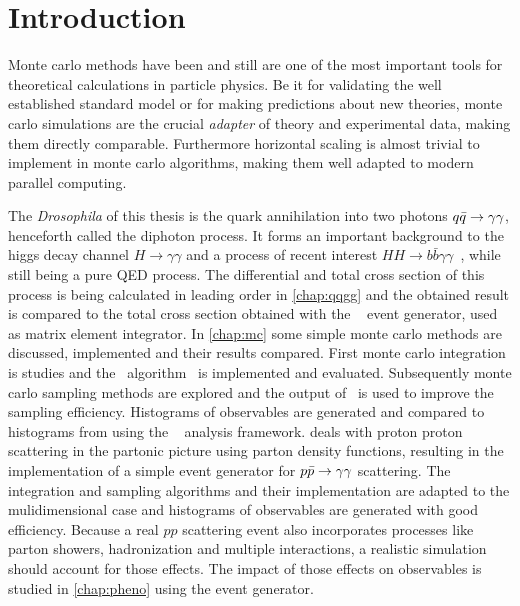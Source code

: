 \chapter{Introduction}%
\label{chap:intro}

Monte carlo methods have been and still are one of the most important
tools for theoretical calculations in particle physics. Be it for
validating the well established standard model or for making
predictions about new theories, monte carlo simulations are the
crucial \emph{adapter} of theory and experimental data, making them
directly comparable. Furthermore horizontal scaling is almost trivial
to implement in monte carlo algorithms, making them well adapted to
modern parallel computing.

The \emph{Drosophila} of this thesis is the quark annihilation into
two photons \(q\bar{q}\rightarrow\gamma\gamma\), henceforth called the diphoton process. It
forms an important background to the higgs decay channel
\(H\rightarrow \gamma\gamma\) and a process of recent interest
\(HH\rightarrow b\bar{b}\gamma\gamma\)~\cite{aaboud2018:sf}, while
still being a pure QED process. The differential and total cross
section of this process is being calculated in leading order in
\cref{chap:qqgg} and the obtained result is compared to the total
cross section obtained with the \sherpa~\cite{Gleisberg:2008ta} event
generator, used as matrix element integrator. In \cref{chap:mc} some
simple monte carlo methods are discussed, implemented and their
results compared. First monte carlo integration is studies and the
\vegas\ algorithm~\cite{Lepage:19781an} is implemented and
evaluated. Subsequently monte carlo sampling methods are explored and
the output of \vegas\ is used to improve the sampling
efficiency. Histograms of observables are generated and compared to
histograms from \sherpa using the \rivet~\cite{Bierlich:2019rhm}
analysis framework.  deals with proton proton
scattering in the partonic picture using parton density functions,
resulting in the implementation of a simple event generator for
\(p\bar{p}\rightarrow\gamma\gamma\) scattering. The integration and sampling algorithms and
their implementation are adapted to the mulidimensional case and
histograms of observables are generated with good efficiency.  Because
a real \(pp\) scattering event also incorporates processes like parton
showers, hadronization and multiple interactions, a realistic
simulation should account for those effects. The impact of those
effects on observables is studied in \cref{chap:pheno} using the
\sherpa event generator.


